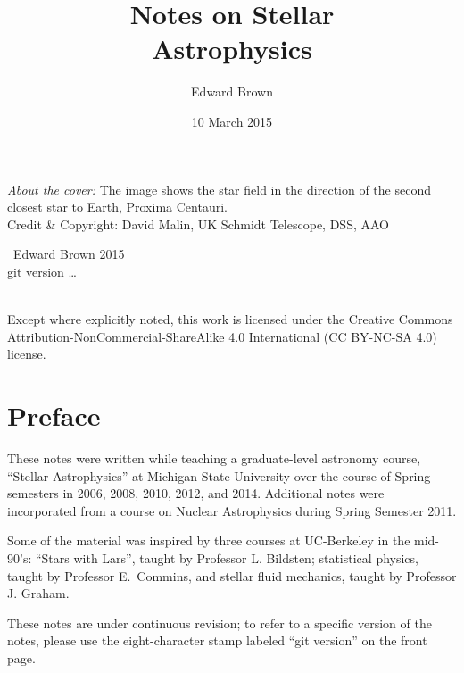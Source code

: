 \documentclass[nofonts,ls]{tufte-book}
\title{Notes on Stellar\\Astrophysics}
\author{Edward Brown}
\date{10 March 2015}
\begin{document}
\frontmatter
{}
\maketitle
\newpage
\begin{fullwidth}
\thispagestyle{empty}

\vspace{3\baselineskip}
\noindent \textit{About the cover:} The image shows the star field in the direction of the second closest star to Earth, Proxima Centauri.\\
\noindent Credit \& Copyright: David Malin, UK Schmidt Telescope, DSS, AAO

\vfill
\noindent \ccCopy\ Edward Brown 2015\\
\noindent git version \ldots

\vspace{3\baselineskip}
\noindent \ccbyncsa \\
\noindent Except where explicitly noted, this work is licensed under the Creative Commons
Attribution-NonCommercial-ShareAlike 4.0 International (CC BY-NC-SA
4.0) license.

\end{fullwidth}

\newpage
\section*{Preface}
These notes were written while teaching a graduate-level astronomy course, ``Stellar Astrophysics'' at Michigan State University over the course of Spring semesters in 2006, 2008, 2010, 2012, and 2014.  Additional notes were incorporated from a course on Nuclear Astrophysics during Spring Semester 2011.

Some of the material was inspired by three courses at UC-Berkeley in the mid-90's: ``Stars with Lars'', taught by Professor L. Bildsten; statistical physics, taught by Professor E.~Commins, and stellar fluid mechanics, taught by Professor J. Graham.

These notes are under continuous revision; to refer to a specific version of the notes, please use the eight-character stamp labeled ``git version'' on the front page.

\tableofcontents
\listoffigures

\mainmatter

















\appendix


\backmatter


\end{document}
